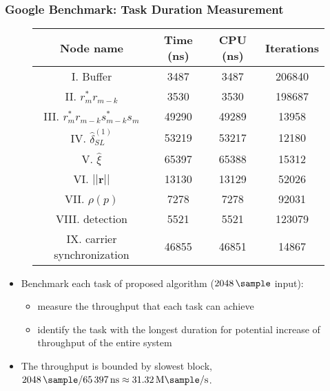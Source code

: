   \begin{frame}
    \frametitle{Google Benchmark: Task Duration Measurement}

    \begin{figure}
        \centering
        \begin{table}[t]
          \tiny
          \centering %
          \begin{tabular}{c c c c} %
          \hline\hline %
          Node name & Time (ns) & CPU (ns) & Iterations \\ [0.5ex] %
          \hline %
          I. Buffer  & 3487 & 3487 & 206840 \\ %
          II. $r_m^*r_{m-k}$  & 3530 & 3530 & 198687 \\
          III. $r_m^*r_{m-k}s_{m-k}^*s_m$ & 49290 & 49289 & 13958 \\
          IV. $\hat{\delta}_{SL}^{(1)}$ & 53219 & 53217 & 12180 \\
          V. $\hat{\xi}$ & 65397 & 65388 & 15312 \\
          VI. $||\bm{r}||$ & 13130 & 13129 & 52026 \\ %
          VII. $\rho(p)$ & 7278 & 7278 & 92031 \\
          VIII. detection & 5521 & 5521 & 123079 \\
          IX. carrier synchronization & 46855 & 46851 & 14867  \\ [1ex]
          \hline
          \end{tabular}
          \label{table:BM_function_nodes} %
        \end{table}   
    \end{figure}

    \begin{itemize}
       \item Benchmark each task of proposed algorithm
         ($\SI{2048}{\sample}$ input):
       \begin{itemize}
        \item measure the throughput that each task can achieve
        \item identify the task with the longest duration for
          potential increase of throughput of the entire system
       \end{itemize}
       \item The throughput is bounded by slowest block, $\SI{2048}{\sample}/\SI{65397}{\nano\second}  \approx \SI[per-mode=symbol]{31.32}{\mega\sample\per\second}$.
    \end{itemize}
  \end{frame}

